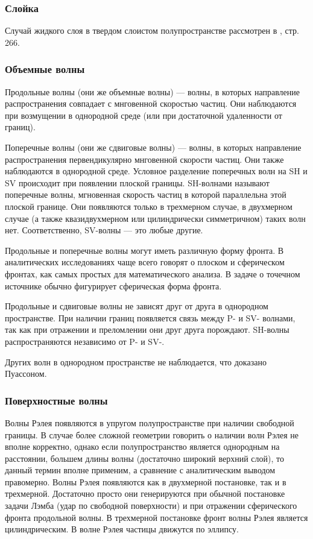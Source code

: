 \subsubsection{Слойка}

Случай жидкого слоя в твердом слоистом полупространстве рассмотрен в \cite{aki_richards}, стр. 266.


\subsubsection{Объемные волны}

Продольные волны (они же объемные волны) — волны, в которых направление распространения совпадает с мнговенной скоростью частиц. Они наблюдаются при возмущении в однородной среде (или при достаточной удаленности от границ).

Поперечные волны (они же сдвиговые волны) — волны, в которых направление распространения первендикулярно мнговенной скорости частиц. Они также наблюдаются в однородной среде. Условное разделение поперечных волн на SH и SV происходит при появлении плоской границы. SH-волнами называют поперечные волны, мгновенная скорость частиц в которой параллельна этой плоской границе. Они появляются только в трехмерном случае, в двухмерном случае (а также квазидвухмерном или цилиндрически симметричном) таких волн нет. Соответственно, SV-волны — это любые другие.

Продольные и поперечные волны могут иметь различную форму фронта. В аналитических исследованиях чаще всего говорят о плоском и сферическом фронтах, как самых простых для математического анализа. В задаче о точечном источнике обычно фигурирует сферическая форма фронта.

Продольные и сдвиговые волны не зависят друг от друга в однородном пространстве. При наличии границ появляется связь между P- и SV- волнами, так как при отражении и преломлении они друг друга порождают. SH-волны распространяются независимо от P- и SV-.

Других волн в однородном пространстве не наблюдается, что доказано Пуассоном.


\subsubsection{Поверхностные волны}
Волны Рэлея появляются в упругом полупространстве при наличии свободной границы. В случае более сложной геометрии говорить о наличии волн Рэлея не вполне корректно, однако если полупространство является однородным на расстоянии, большем длины волны (достаточно широкий верхний слой), то данный термин вполне применим, а сравнение с аналитическим выводом правомерно. Волны Рэлея появляются как в двухмерной постановке, так и в трехмерной. Достаточно просто они генерируются при обычной постановке задачи Лэмба (удар по свободной поверхности) и при отражении сферического фронта продольной волны. В трехмерной постановке фронт волны Рэлея является цилиндрическим. В волне Рэлея частицы движутся по эллипсу.

